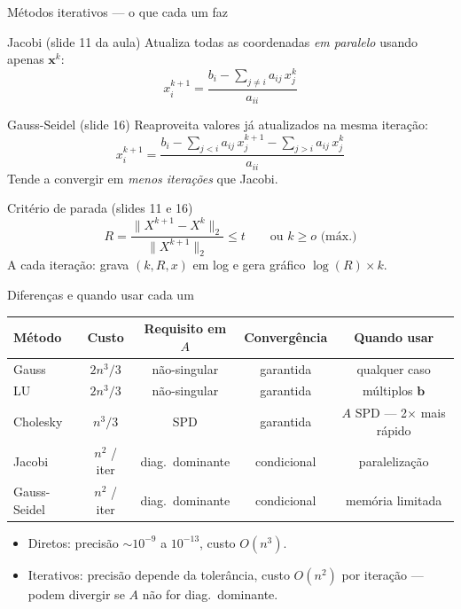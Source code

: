 \documentclass[10pt,aspectratio=169]{beamer}
\begin{document}
\begin{frame}{Métodos iterativos --- o que cada um faz}
  \begin{block}{Jacobi (slide 11 da aula)}
    Atualiza todas as coordenadas \emph{em paralelo} usando apenas $\mathbf{x}^k$:
    \[ x_i^{k+1} = \frac{b_i - \sum_{j \ne i} a_{ij}\,x_j^{k}}{a_{ii}} \]
  \end{block}

  \begin{block}{Gauss-Seidel (slide 16)}
    \alert{Reaproveita} valores já atualizados na mesma iteração:
    \[ x_i^{k+1} = \frac{b_i - \sum_{j<i} a_{ij}\,x_j^{k+1} - \sum_{j>i} a_{ij}\,x_j^{k}}{a_{ii}} \]
    Tende a convergir em \emph{menos iterações} que Jacobi.
  \end{block}

  \begin{block}{Critério de parada (slides 11 e 16)}
    \[ R = \frac{\| X^{k+1} - X^{k} \|_2}{\| X^{k+1} \|_2} \le t \qquad \text{ou } k \ge o \text{ (máx.)} \]
    A cada iteração: grava $(k, R, x)$ em log e gera gráfico $\log(R)\times k$.
  \end{block}
\end{frame}

\begin{frame}{Diferenças e quando usar cada um}
  \begin{table}
  \centering
  \scriptsize
  \begin{tabular}{lcccc}
    \toprule
    \textbf{Método} & \textbf{Custo} & \textbf{Requisito em $A$} & \textbf{Convergência} & \textbf{Quando usar} \\
    \midrule
    Gauss            & $2n^3/3$ & não-singular        & garantida & qualquer caso \\
    LU               & $2n^3/3$ & não-singular        & garantida & múltiplos $\mathbf{b}$ \\
    Cholesky         & $n^3/3$  & SPD                 & garantida & $A$ SPD --- \alert{2$\times$ mais rápido} \\
    \midrule
    Jacobi           & $n^2$ / iter & diag.\ dominante & condicional & paralelização \\
    Gauss-Seidel     & $n^2$ / iter & diag.\ dominante & condicional & memória limitada \\
    \bottomrule
  \end{tabular}
  \end{table}

  \vspace{0.6em}
  \begin{itemize}
    \item Diretos: precisão $\sim 10^{-9}$ a $10^{-13}$, custo $O(n^3)$.
    \item Iterativos: precisão depende da tolerância, custo $O(n^2)$ por iteração --- \alert{podem divergir} se $A$ não for diag.\ dominante.
  \end{itemize}
\end{frame}
\end{document}
